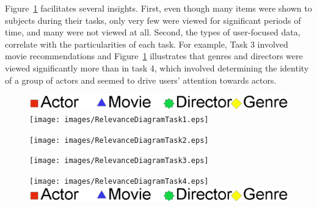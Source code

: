 Figure~\ref{fig:RelevanceDiagram} facilitates several insights. First, even though many items were shown to subjects during their tasks, only very few were viewed for significant periods of time, and many were not viewed at all. Second, the types of user-focused data, correlate with the particularities of each task. For example, Task 3 involved movie recommendations and Figure~\ref{fig:RelevanceDiagram} illustrates that genres and directors were viewed significantly more than in task 4, which involved determining the identity of a group of actors and seemed to drive users' attention towards actors. 

\begin{figure}[!htb]
  \centering
	\includegraphics[width=0.45\linewidth]{images/Legends.eps}
  \texttt{[image: images/RelevanceDiagramTask1.eps]}
	
	\texttt{[image: images/RelevanceDiagramTask2.eps]}
	
	\texttt{[image: images/RelevanceDiagramTask3.eps]}
	
	\texttt{[image: images/RelevanceDiagramTask4.eps]}
	\includegraphics[width=0.45\linewidth]{images/Legends.eps}
	
	\label{fig:RelevanceDiagram}
\end{figure}



